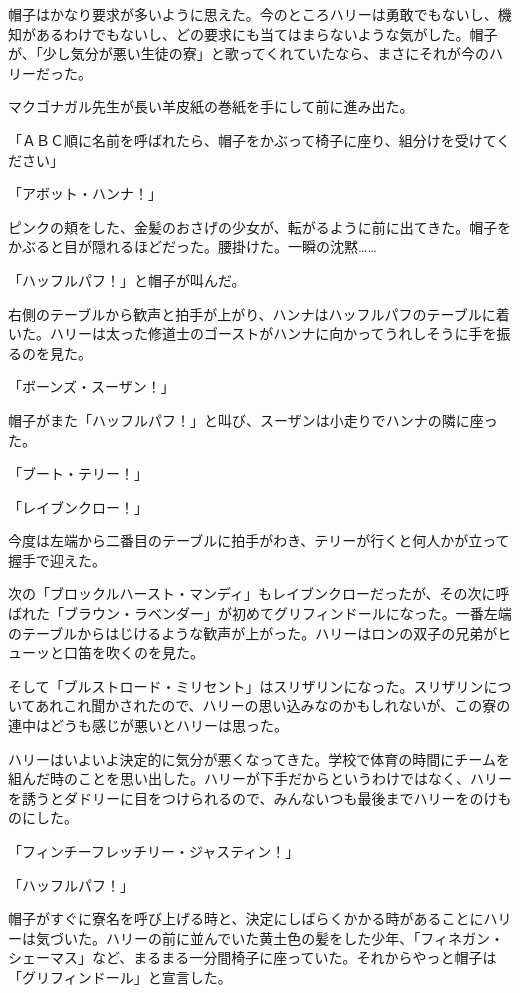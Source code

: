 \documentclass[10pt,a4paper]{article}
\begin{document}
\begin{CJK}{UTF8}{min}
帽子はかなり要求が多いように思えた。今のところハリーは勇敢でもないし、機知があるわけでもないし、どの要求にも当てはまらないような気がした。帽子が、「少し気分が悪い生徒の寮」と歌ってくれていたなら、まさにそれが今のハリーだった。

マクゴナガル先生が長い羊皮紙の巻紙を手にして前に進み出た。

「ＡＢＣ順に名前を呼ばれたら、帽子をかぶって椅子に座り、組分けを受けてください」

「アボット・ハンナ！」

ピンクの頬をした、金髪のおさげの少女が、転がるように前に出てきた。帽子をかぶると目が隠れるほどだった。腰掛けた。一瞬の沈黙……

「ハッフルパフ！」と帽子が叫んだ。

右側のテーブルから歓声と拍手が上がり、ハンナはハッフルパフのテーブルに着いた。ハリーは太った修道士のゴーストがハンナに向かってうれしそうに手を振るのを見た。

「ボーンズ・スーザン！」

帽子がまた「ハッフルパフ！」と叫び、スーザンは小走りでハンナの隣に座った。

「ブート・テリー！」

「レイブンクロー！」

今度は左端から二番目のテーブルに拍手がわき、テリーが行くと何人かが立って握手で迎えた。

次の「ブロックルハースト・マンディ」もレイブンクローだったが、その次に呼ばれた「ブラウン・ラベンダー」が初めてグリフィンドールになった。一番左端のテーブルからはじけるような歓声が上がった。ハリーはロンの双子の兄弟がヒューッと口笛を吹くのを見た。

そして「ブルストロード・ミリセント」はスリザリンになった。スリザリンについてあれこれ聞かされたので、ハリーの思い込みなのかもしれないが、この寮の連中はどうも感じが悪いとハリーは思った。

ハリーはいよいよ決定的に気分が悪くなってきた。学校で体育の時間にチームを組んだ時のことを思い出した。ハリーが下手だからというわけではなく、ハリーを誘うとダドリーに目をつけられるので、みんないつも最後までハリーをのけものにした。

「フィンチーフレッチリー・ジャスティン！」

「ハッフルパフ！」

帽子がすぐに寮名を呼び上げる時と、決定にしばらくかかる時があることにハリーは気づいた。ハリーの前に並んでいた黄土色の髪をした少年、「フィネガン・シェーマス」など、まるまる一分間椅子に座っていた。それからやっと帽子は「グリフィンドール」と宣言した。


\end{CJK}
\end{document}
